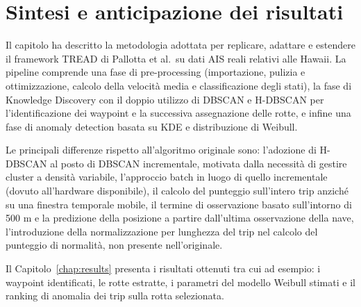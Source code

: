 \section{Sintesi e anticipazione dei risultati}\label{sec:meth_summary}

Il capitolo ha descritto la metodologia adottata per replicare, adattare e estendere il framework TREAD 
di Pallotta et al.\ su dati AIS reali relativi alle Hawaii. 
La pipeline comprende una fase di pre-processing (importazione, pulizia e ottimizzazione, calcolo della velocità media 
e classificazione degli stati), la fase di Knowledge Discovery con il doppio utilizzo di DBSCAN e H-DBSCAN 
per l'identificazione dei waypoint e la successiva assegnazione delle rotte, 
e infine una fase di anomaly detection basata su KDE e distribuzione di Weibull.

Le principali differenze rispetto all'algoritmo originale sono: l'adozione di H-DBSCAN al posto di DBSCAN incrementale, 
motivata dalla necessità di gestire cluster a densità variabile, 
l'approccio batch in luogo di quello incrementale (dovuto all'hardware disponibile), il calcolo del punteggio sull'intero trip anziché su una finestra temporale mobile,
il termine di osservazione basato sull'intorno di 500 m e la predizione della posizione a partire dall'ultima osservazione della nave,
l'introduzione della normalizzazione per lunghezza del trip nel calcolo del punteggio di normalità, non presente nell'originale.

Il Capitolo~\ref{chap:results} presenta i risultati ottenuti tra cui ad esempio: i waypoint identificati, 
le rotte estratte, i parametri del modello Weibull stimati e il ranking di anomalia dei trip sulla rotta selezionata.